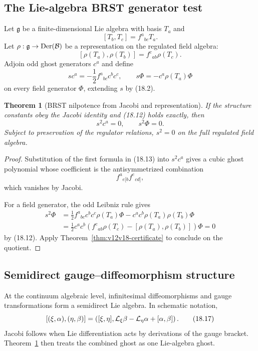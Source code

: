 \documentclass[11pt]{article}
\newtheorem{theorem}{Theorem}[section]
\theoremstyle{remark}
\begin{document}
\subsection{The Lie-algebra BRST generator test}

Let \(\mathfrak g\) be a finite-dimensional Lie algebra with basis
\(T_a\) and
\[
                         [T_b,T_c]=f^a{}_{bc}T_a.           \tag{18.11}
\]
Let \(\rho:\mathfrak g\to\operatorname{Der}({\cal B})\) be a
representation on the regulated field algebra:
\[
                         [\rho(T_a),\rho(T_b)]
 =f^c{}_{ab}\rho(T_c).                                     \tag{18.12}
\]
Adjoin odd ghost generators \(c^a\) and define
\[
 sc^a=-\frac12 f^a{}_{bc}c^bc^c,\qquad
 s\Phi=-c^a\rho(T_a)\Phi                                  \tag{18.13}
\]
on every field generator \(\Phi\), extending \(s\) by (18.2).

\begin{theorem}[BRST nilpotence from Jacobi and representation]
\label{thm:v12v18-Lie}
If the structure constants obey the Jacobi identity and (18.12)
holds exactly, then
\[
                         s^2c^a=0,\qquad s^2\Phi=0.         \tag{18.14}
\]
Subject to preservation of the regulator relations, \(s^2=0\) on
the full regulated field algebra.
\end{theorem}

\begin{proof}
Substitution of the first formula in (18.13) into \(s^2c^a\) gives a
cubic ghost polynomial whose coefficient is the antisymmetrized
combination
\[
                         f^a{}_{e[b}f^e{}_{cd]},            \tag{18.15}
\]
which vanishes by Jacobi.

For a field generator, the odd Leibniz rule gives
\[
\begin{split}
 s^2\Phi
 &=
 \frac12 f^a{}_{bc}c^bc^c\rho(T_a)\Phi
 -c^ac^b\rho(T_a)\rho(T_b)\Phi\\
 &=
 \frac12 c^ac^b
 \left(
 f^c{}_{ab}\rho(T_c)-[\rho(T_a),\rho(T_b)]
 \right)\Phi=0                                             \tag{18.16}
\end{split}
\]
by (18.12).  Apply
Theorem~\ref{thm:v12v18-certificate} to conclude on the quotient.
\end{proof}

\subsection{Semidirect gauge--diffeomorphism structure}

At the continuum algebraic level, infinitesimal diffeomorphisms and
gauge transformations form a semidirect Lie algebra.  In schematic
notation,
\[
 [(\xi,\alpha),(\eta,\beta)]
 =
 \left(
 [\xi,\eta],
 {\cal L}_\xi\beta-{\cal L}_\eta\alpha+[\alpha,\beta]
 \right).                                                   \tag{18.17}
\]
Jacobi follows when Lie differentiation acts by derivations of the
gauge bracket.  Theorem~\ref{thm:v12v18-Lie} then treats the combined
ghost as one Lie-algebra ghost.
\end{document}
